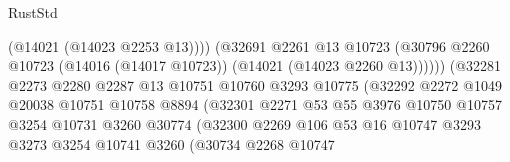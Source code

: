 \begin{lexlean}{RustStd}
\begin{coremodule}
                                              (@14021 (@14023 @2253 @13))))
                                          (@32691
                                            @2261
                                            @13
                                            @10723
                                            (@30796
                                              @2260
                                              @10723
                                              (@14016 (@14017 @10723))
                                              (@14021 (@14023 @2260 @13))))))
                                      (@32281
                                        @2273
                                        @2280
                                        @2287
                                        @13
                                        @10751
                                        @10760
                                        @3293
                                        @10775
                                        (@32292
                                          @2272
                                          @1049
                                          @20038
                                          @10751
                                          @10758
                                          @8894
                                          (@32301
                                            @2271
                                            @53
                                            @55
                                            @3976
                                            @10750
                                            @10757
                                            @3254
                                            @10731
                                            @3260
                                            @30774
                                            (@32300
                                              @2269
                                              @106
                                              @53
                                              @16
                                              @10747
                                              @3293
                                              @3273
                                              @3254
                                              @10741
                                              @3260
                                              (@30734
                                                @2268
                                                @10747

\end{coremodule}
\end{lexlean}
